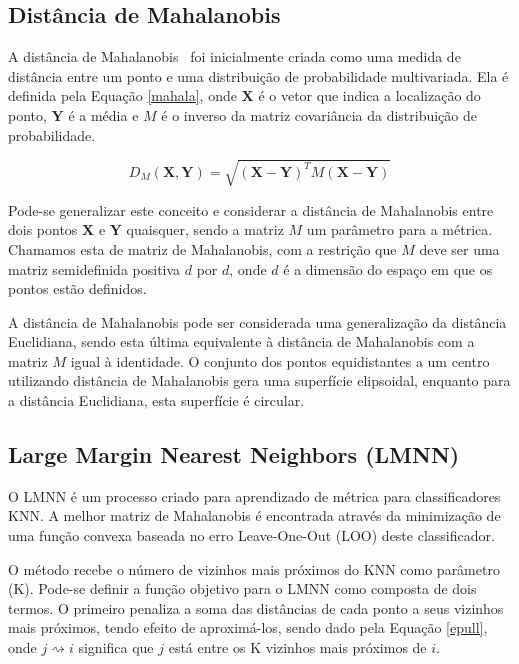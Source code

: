 \documentclass[
	12pt,				%
	openright,			%
	twoside,			%
	a4paper,			%
	english,			%
	spanish,			%
	brazil,				%
	]{abntex2}\usepackage[]{graphicx}\usepackage[]{color}
\begin{document}
\subsection{Distância de Mahalanobis}

A distância de Mahalanobis~\cite{Duda2000} foi inicialmente criada como uma medida de distância entre um ponto e uma distribuição de probabilidade multivariada. Ela é definida pela Equação \ref{mahala}, onde $\mathbf{X}$ é o vetor que indica a localização do ponto, $\mathbf{Y}$ é a média e $M$ é o inverso da matriz covariância da distribuição de probabilidade.

\begin{equation}
D_{M}(\mathbf{X},\mathbf{Y}) = \sqrt{(\mathbf{X}-\mathbf{Y})^T M (\mathbf{X}-\mathbf{Y})}
\label{mahala}
\end{equation}


\par Pode-se generalizar este conceito e considerar a distância de Mahalanobis entre dois pontos $\mathbf{X}$ e $\mathbf{Y}$ quaisquer, sendo a matriz $M$ um parâmetro para a métrica. Chamamos esta de matriz de Mahalanobis, com a restrição que $M$ deve ser uma matriz semidefinida positiva $d$ por $d$, onde $d$ é a dimensão do espaço em que os pontos estão definidos.

A distância de Mahalanobis pode ser considerada uma generalização da distância Euclidiana, sendo esta última equivalente à distância de Mahalanobis com a matriz $M$ igual à identidade. O conjunto dos pontos equidistantes a um centro utilizando distância de Mahalanobis gera uma superfície elipsoidal, enquanto para a distância Euclidiana, esta superfície é circular. 


\subsection{Large Margin Nearest Neighbors (LMNN)}

O LMNN \cite{Weinberger2009} é um processo criado para aprendizado de métrica para classificadores KNN. A melhor matriz de Mahalanobis é encontrada através da minimização de uma função convexa baseada no erro Leave-One-Out (LOO) deste classificador.

O método recebe o número de vizinhos mais próximos do KNN como parâmetro (K). Pode-se definir a função objetivo para o LMNN como composta de dois termos. O primeiro penaliza a soma das distâncias de cada ponto a seus vizinhos mais próximos, tendo efeito de aproximá-los, sendo dado pela Equação \ref{epull}, onde $j \rightsquigarrow i$ significa que $j$ está entre os K vizinhos mais próximos de $i$.
\end{document}
